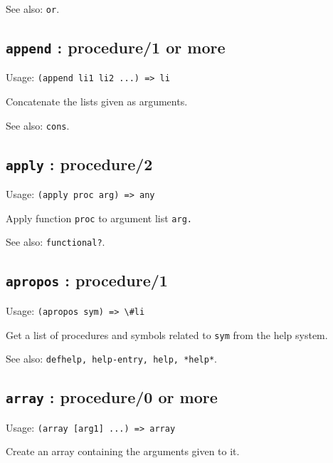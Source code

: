 \documentclass[
]{article}
\newcommand{\passthrough}[1]{#1}
\begin{document}
See also: \passthrough{\lstinline!or!}.

\hypertarget{append-procedure1-or-more-1}{%
\subsection{\texorpdfstring{\texttt{append} : procedure/1 or
more}{append : procedure/1 or more}}\label{append-procedure1-or-more-1}}

Usage: \passthrough{\lstinline!(append li1 li2 ...) => li!}

Concatenate the lists given as arguments.

See also: \passthrough{\lstinline!cons!}.

\hypertarget{apply-procedure2-1}{%
\subsection{\texorpdfstring{\texttt{apply} :
procedure/2}{apply : procedure/2}}\label{apply-procedure2-1}}

Usage: \passthrough{\lstinline!(apply proc arg) => any!}

Apply function \passthrough{\lstinline!proc!} to argument list
\passthrough{\lstinline!arg.!}

See also: \passthrough{\lstinline!functional?!}.

\hypertarget{apropos-procedure1-1}{%
\subsection{\texorpdfstring{\texttt{apropos} :
procedure/1}{apropos : procedure/1}}\label{apropos-procedure1-1}}

Usage: \passthrough{\lstinline!(apropos sym) => \#li!}

Get a list of procedures and symbols related to
\passthrough{\lstinline!sym!} from the help system.

See also: \passthrough{\lstinline!defhelp, help-entry, help, *help*!}.

\hypertarget{array-procedure0-or-more-1}{%
\subsection{\texorpdfstring{\texttt{array} : procedure/0 or
more}{array : procedure/0 or more}}\label{array-procedure0-or-more-1}}

Usage: \passthrough{\lstinline!(array [arg1] ...) => array!}

Create an array containing the arguments given to it.
\end{document}
